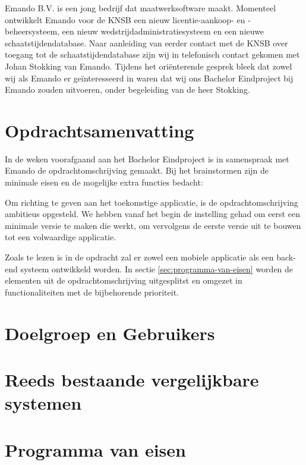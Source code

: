 Emando B.V. is een jong bedrijf dat maatwerksoftware maakt. Momenteel ontwikkelt Emando voor de \acf{KNSB} een nieuw licentie-aankoop- en -beheersysteem, een nieuw wedstrijdadministratiesysteem en een nieuwe schaatstijdendatabase. Naar aanleiding van eerder contact met de \ac{KNSB} over toegang tot de schaatstijdendatabase zijn wij in telefonisch contact gekomen met Johan Stokking van Emando. Tijdens het oriënterende gesprek bleek dat zowel wij als Emando er geïnteresseerd in waren dat wij ons Bachelor Eindproject bij Emando zouden uitvoeren, onder begeleiding van de heer Stokking.

\section{Opdrachtsamenvatting}
In de weken voorafgaand aan het Bachelor Eindproject is in samenspraak met Emando de opdrachtomschrijving gemaakt. Bij het brainstormen zijn de minimale eisen en de mogelijke extra functies bedacht:



Om richting te geven aan het toekomstige applicatie, is de opdrachtomschrijving ambitieus opgesteld. We hebben vanaf het begin de instelling gehad om eerst een minimale versie te maken die werkt, om vervolgens de eerste versie uit te bouwen tot een volwaardige applicatie.

Zoals te lezen is in de opdracht zal er zowel een mobiele applicatie als een back-end systeem ontwikkeld worden. In sectie \ref{sec:programma-van-eisen} worden de elementen uit de opdrachtomschrijving uitgesplitst en omgezet in functionaliteiten met de bijbehorende prioriteit.

\section{Doelgroep en Gebruikers}



\section{Reeds bestaande vergelijkbare systemen}


    
\section{Programma van eisen} %


